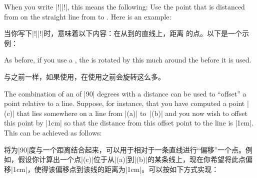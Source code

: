%
\begin{quote}
\end{quote}

When you write |!||!|, this means the
following: Use the point that is distanced  from  on
the straight line from  to . Here is an example:

当你写下|!||!|时，意味着以下内容：在从到的直线上，距离 的点。以下是一个示例：

%
\begin{codeexample}[preamble={\usetikzlibrary{calc}}]
\end{codeexample}

As before, if you use a , the  is rotated
by this much around the  before it is used.

与之前一样，如果使用，在使用之前会旋转这么多。

The combination of an  of |90| degrees with a distance can be used
to ``offset'' a point relative to a line. Suppose, for instance, that you have
computed a point |(c)| that lies somewhere on a line from |(a)| to~|(b)| and
you now wish to offset this point by |1cm| so that the distance from this
offset point to the line is |1cm|. This can be achieved as follows:

将为|90|度与一个距离结合起来，可以用于相对于一条直线进行“偏移”一个点。例如，假设你计算出一个点|(c)|位于从|(a)|到|(b)|的某条线上，现在你希望将此点偏移|1cm|，使得该偏移点到该线的距离为|1cm|。可以按如下方式实现：

%
\begin{codeexample}[preamble={\usetikzlibrary{calc}}]
\end{codeexample}


